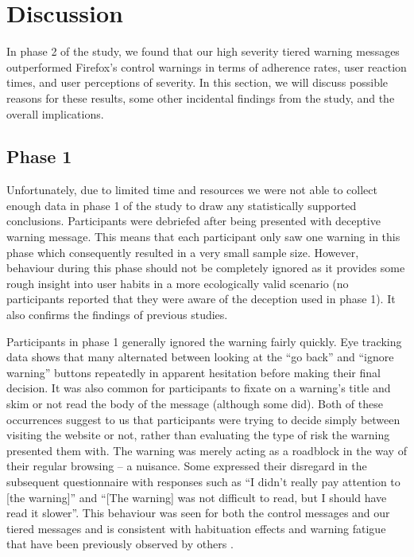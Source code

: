 \chapter{Discussion}
\label{Discussion}

In phase 2 of the study, we found that our high severity tiered warning messages outperformed Firefox's control warnings in terms of adherence rates, user reaction times, and user perceptions of severity. In this section, we will discuss possible reasons for these results, some other incidental findings from the study, and the overall implications.


\section{Phase 1}
Unfortunately, due to limited time and resources we were not able to collect enough data in phase 1 of the study to draw any statistically supported conclusions. Participants were debriefed after being presented with deceptive warning message. This means that each participant only saw one warning in this phase which consequently resulted in a very small sample size. However, behaviour during this phase should not be completely ignored as it provides some rough insight into user habits in a more ecologically valid scenario (no participants reported that they were aware of the deception used in phase 1). It also confirms the findings of previous studies.

Participants in phase 1 generally ignored the warning fairly quickly. Eye tracking data shows that many alternated between looking at the ``go back'' and ``ignore warning'' buttons repeatedly in apparent hesitation before making their final decision. It was also common for participants to fixate on a warning's title and skim or not read the body of the message (although some did). Both of these occurrences suggest to us that participants were trying to decide simply between visiting the website or not, rather than evaluating the type of risk the warning presented them with. The warning was merely acting as a roadblock in the way of their regular browsing -- a nuisance. Some expressed their disregard in the subsequent questionnaire with responses such as ``I didn't really pay attention to [the warning]'' and ``[The warning] was not difficult to read, but I should have read it slower''. This behaviour was seen for both the control messages and our tiered messages and is consistent with habituation effects and warning fatigue that have been previously observed by others \cite{akhawe2013alice, anderson2015polymorphic, egelman2008warned}.

